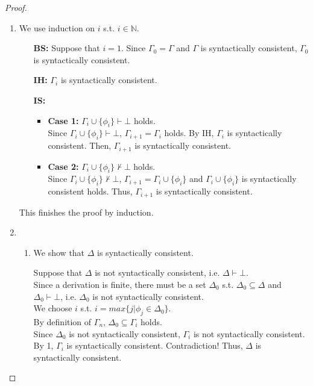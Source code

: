 \documentclass[12pt,a4paper]{article}
\theoremstyle{plain}
\theoremstyle{definition}
\begin{document}
\begin{proof}\
\begin{enumerate}
    \item
    We use induction on $i$ s.t. $i \in \mathbb{N}$.
        \begin{itemize}
        
        \item[\textbf{BS:}]
            Suppose that $i=1$. Since $\Gamma_0 = \Gamma$ and $\Gamma$ is syntactically consistent, $\Gamma_0$ is syntactically consistent.
            
        \item[\textbf{IH:}]
            $\Gamma_i$ is syntactically consistent.
            
        \item[\textbf{IS:}]
                \begin{itemize}
                    \item \textbf{Case 1:} $\Gamma_i \cup \{\phi_i\} \vdash \bot $ holds.\\
                    Since $\Gamma_i \cup \{\phi_i\}\vdash \bot $, $\Gamma_{i+1}=\Gamma_i$ holds. By IH, $\Gamma_i$ is syntactically consistent. Then, $\Gamma_{i+1}$ is syntactically consistent.
                    
                    \item \textbf{Case 2:} $\Gamma_i \cup \{\phi_i\}  \not \vdash \bot $ holds.\\
                    Since $\Gamma_i \cup \{\phi_i\}  \not \vdash \bot $, $\Gamma_{i+1}=\Gamma_i \cup \{\phi_i\}$ and $\Gamma_i \cup \{\phi_i\}$ is syntactically consistent holds. Thus, $\Gamma_{i+1}$ is syntactically consistent.  
                \end{itemize}
        \end{itemize}   
    This finishes the proof by induction.
    
    \item
        \begin{enumerate}
            \item 
            We show that $\Delta$ is syntactically consistent.
            
            Suppose that $\Delta$ is not syntactically consistent, i.e. $\Delta \vdash \bot$.\\
            Since a derivation is finite, there must be a set $\Delta_0$ s.t. $\Delta_0 \subseteq \Delta$ and $\Delta_0 \vdash \bot$, i.e. $\Delta_0$ is not syntactically consistent.\\
            We choose $i$ s.t. $i=max\{j \vert \phi_j \in \Delta_0\}$.\\
            By definition of $\Gamma_n$, $\Delta_0 \subseteq \Gamma_i$ holds.\\
            Since $\Delta_0$ is not syntactically consistent, $\Gamma_i$ is not syntactically consistent. 
            By 1, $\Gamma_i$ is syntactically consistent. Contradiction!
            Thus, $\Delta$ is syntactically consistent.
            

\end{enumerate}
\end{enumerate}
\end{proof}
\end{document}
